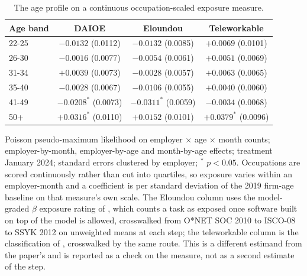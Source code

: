 \begin{table}[ht!]
\centering
\caption{The age profile on a continuous occupation-scaled exposure measure.}
\label{tab:age_profile_rebuilt}
\footnotesize
\begin{tabular}{lccc}
\toprule
Age band & DAIOE & Eloundou & Teleworkable \\
\midrule
22-25 & $-0.0132$ (0.0112) & $-0.0132$ (0.0085) & $+0.0069$ (0.0101) \\
26-30 & $-0.0016$ (0.0077) & $-0.0054$ (0.0061) & $+0.0051$ (0.0069) \\
31-34 & $+0.0039$ (0.0073) & $-0.0028$ (0.0057) & $+0.0063$ (0.0065) \\
35-40 & $-0.0028$ (0.0067) & $-0.0106$ (0.0055) & $+0.0040$ (0.0060) \\
41-49 & $-0.0208^{*}$ (0.0073) & $-0.0311^{*}$ (0.0059) & $-0.0034$ (0.0068) \\
50+ & $+0.0316^{*}$ (0.0110) & $+0.0152$ (0.0101) & $+0.0379^{*}$ (0.0096) \\
\bottomrule
\end{tabular}
\begin{minipage}{0.94\textwidth}\footnotesize\vspace{4pt}
Poisson pseudo-maximum likelihood on employer $\times$ age $\times$ month counts; employer-by-month, employer-by-age and month-by-age effects; treatment January 2024; standard errors clustered by employer; $^{*}$ $p<0.05$. Occupations are scored continuously rather than cut into quartiles, so exposure varies within an employer-month and a coefficient is per standard deviation of the 2019 firm-age baseline on that measure's own scale. The Eloundou column uses the model-graded $\beta$ exposure rating of \citet{eloundou2024gpts}, which counts a task as exposed once software built on top of the model is allowed, crosswalked from O*NET SOC 2010 to ISCO-08 to SSYK 2012 on unweighted means at each step; the teleworkable column is the classification of \citet{dingel2020many}, crosswalked by the same route. This is a different estimand from the paper's and is reported as a check on the measure, not as a second estimate of the step.
\end{minipage}
\end{table}
